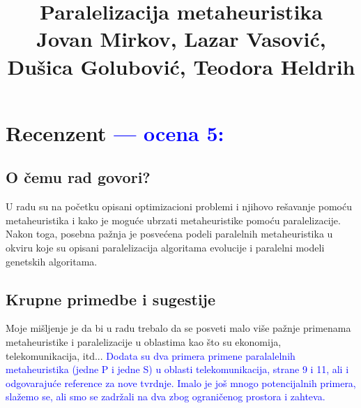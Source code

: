 \documentclass[a4paper]{report}
\newcommand{\odgovor}[1]{\textcolor{blue}{#1}}
\begin{document}
\title{Paralelizacija metaheuristika\\ \small{Jovan Mirkov, Lazar Vasović, Dušica Golubović, Teodora Heldrih}}

\maketitle

\tableofcontents

\chapter{Recenzent \odgovor{--- ocena 5:} }


\section{O čemu rad govori?}
U radu su na početku opisani optimizacioni problemi i njihovo rešavanje pomoću metaheuristika i kako je moguće ubrzati metaheuristike pomoću paralelizacije. Nakon toga, posebna pažnja je posvećena podeli paralelnih metaheuristika u okviru koje su opisani paralelizacija algoritama evolucije i paralelni modeli genetskih algoritama.
\section{Krupne primedbe i sugestije}
Moje mišljenje je da bi u radu trebalo da se posveti malo više pažnje primenama metaheuristike i paralelizacije u oblastima kao što su ekonomija, telekomunikacija, itd...
\odgovor{Dodata su dva primera primene paralalelnih metaheuristika (jedne P i jedne S) u oblasti telekomunikacija, strane 9 i 11, ali i odgovarajuće reference za nove tvrdnje. Imalo je još mnogo potencijalnih primera, slažemo se, ali smo se zadržali na dva zbog ograničenog prostora i zahteva.}
\end{document}
